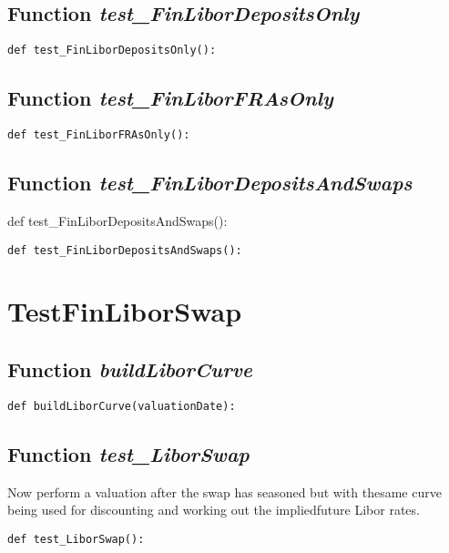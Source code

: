 \documentclass[twoside,11pt]{book}
\begin{document}
\subsection{Function {\it test\_FinLiborDepositsOnly}}


\begin{lstlisting}
def test_FinLiborDepositsOnly():
\end{lstlisting}

\subsection{Function {\it test\_FinLiborFRAsOnly}}


\begin{lstlisting}
def test_FinLiborFRAsOnly():
\end{lstlisting}

\subsection{Function {\it test\_FinLiborDepositsAndSwaps}}
def test\_FinLiborDepositsAndSwaps():

\begin{lstlisting}
def test_FinLiborDepositsAndSwaps():
\end{lstlisting}


\newpage
\section{TestFinLiborSwap}

\subsection{Function {\it buildLiborCurve}}


\begin{lstlisting}
def buildLiborCurve(valuationDate):
\end{lstlisting}

\subsection{Function {\it test\_LiborSwap}}
Now perform a valuation after the swap has seasoned but with thesame curve being used for discounting and working out the impliedfuture Libor rates. 

\begin{lstlisting}
def test_LiborSwap():
\end{lstlisting}
\end{document}
